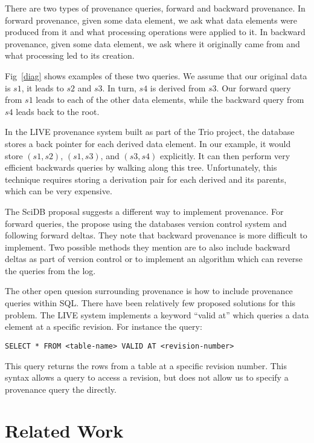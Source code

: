 \documentclass[11pt]{article}
\begin{document}
There are two types of provenance queries, forward and backward provenance. In forward provenance, given some data element, we ask what data elements were produced from it and what processing operations were applied to it. In backward provenance, given some data element, we ask where it originally came from and what processing led to its creation. 

Fig~\ref{diag} shows examples of these two queries. We assume that our original data is $s1$, it leads to $s2$ and $s3$. In turn, $s4$ is derived from $ s3$. Our forward query from $ s1$ leads to each of the other data elements, while the backward query from  $s4$ leads back to the root.  

In the LIVE provenance system built as part of the Trio project, the database stores a back pointer for each derived data element. In our example, it would store $(s1, s2)$, $(s1, s3)$, and $(s3, s4)$ explicitly. It can then perform very efficient backwards queries by walking along this tree. Unfortunately, this technique requires storing a derivation pair for each derived and its parents, which can be very expensive.  

The SciDB proposal suggests a different way to implement provenance. For forward queries, the propose using the databases version control system and following forward deltas. They note that backward provenance is more difficult to implement. Two possible methods they mention are to also include backward deltas as part of version control or to implement an algorithm which can reverse the queries from the log. 

The other open quesion surrounding provenance is how to include provenance queries within SQL. There have been relatively few proposed solutions for this problem. The LIVE system implements a keyword ``valid at'' which queries a data element at a specific revision. For instance the query:

\begin{verbatim}
SELECT * FROM <table-name> VALID AT <revision-number>
\end{verbatim}

This query returns the rows from a table at a specific revision number. This syntax allows a query to access a revision, but does not allow us to specify a provenance query the directly. 

\section{Related Work}
\end{document}
